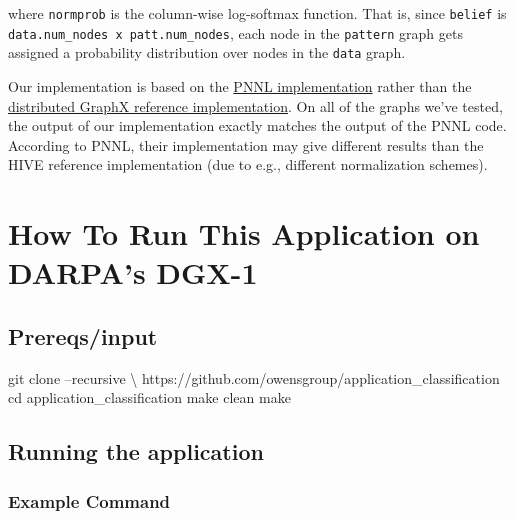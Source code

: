 \documentclass[10pt,oneside]{memoir}
\newenvironment{Shaded}{}{}
\newcommand{\BuiltInTok}[1]{#1}
\newcommand{\FunctionTok}[1]{\textcolor[rgb]{0.02,0.16,0.49}{#1}}
\newcommand{\NormalTok}[1]{#1}
\begin{document}
where \texttt{normprob} is the column-wise log-softmax function. That
is, since \texttt{belief} is
\texttt{data.num\_nodes\ x\ patt.num\_nodes}, each node in the
\texttt{pattern} graph gets assigned a probability distribution over
nodes in the \texttt{data} graph.

Our implementation is based on the
\href{https://gitlab.hiveprogram.com/pnnl/ApplicationClassification}{PNNL
implementation} rather than the
\href{https://gitlab.hiveprogram.com/jcromano/applicationClassification}{distributed
GraphX reference implementation}. On all of the graphs we've tested, the
output of our implementation exactly matches the output of the PNNL
code. According to PNNL, their implementation may give different results
than the HIVE reference implementation (due to e.g., different
normalization schemes).

\hypertarget{how-to-run-this-application-on-darpas-dgx-1}{%
\section{How To Run This Application on DARPA's
DGX-1}\label{how-to-run-this-application-on-darpas-dgx-1}}

\hypertarget{prereqsinput}{%
\subsection{Prereqs/input}\label{prereqsinput}}

\begin{Shaded}
\begin{Highlighting}[]
\FunctionTok{git}\NormalTok{ clone --recursive \textbackslash{}}
\NormalTok{        https://github.com/owensgroup/application_classification}
\BuiltInTok{cd}\NormalTok{ application_classification}
\FunctionTok{make}\NormalTok{ clean}
\FunctionTok{make}
\end{Highlighting}
\end{Shaded}

\hypertarget{running-the-application}{%
\subsection{Running the application}\label{running-the-application}}

\hypertarget{example-command}{%
\subsubsection{Example Command}\label{example-command}}
\end{document}

